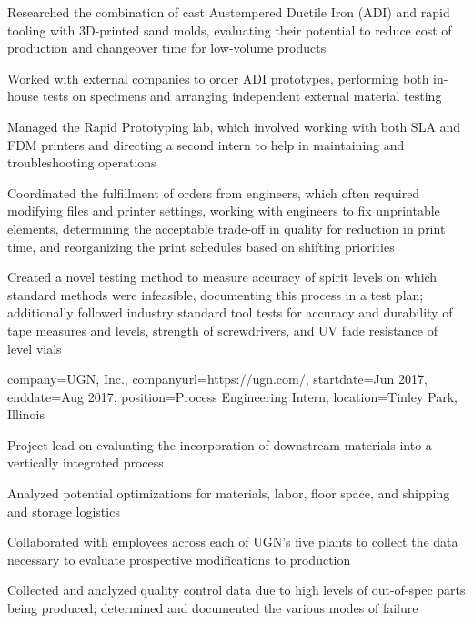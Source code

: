 \documentclass[10pt]{article}
\begin{document}
\begin{resume_sec}
\begin{subsec}
        \item Researched the combination of cast Austempered Ductile Iron (ADI) and rapid tooling with 3D-printed sand molds, evaluating their potential to reduce cost of production and changeover time for low-volume products
        \item Worked with external companies to order ADI prototypes, performing both in-house tests on specimens and arranging independent external material testing
        \item Managed the Rapid Prototyping lab, which involved working with both SLA and FDM printers and directing a second intern to help in maintaining and troubleshooting operations
        \item Coordinated the fulfillment of orders from engineers, which often required modifying files and printer settings, working with engineers to fix unprintable elements, determining the acceptable trade-off in quality for reduction in print time, and reorganizing the print schedules based on shifting priorities
        \item Created a novel testing method to measure accuracy of spirit levels on which standard methods were infeasible, documenting this process in a test plan; additionally followed industry standard tool tests for accuracy and durability of tape measures and levels, strength of screwdrivers, and UV fade resistance of level vials
    \end{subsec}
    
    \begin{subsec}
        {
            company={UGN, Inc.},
            companyurl={https://ugn.com/},
            startdate={Jun 2017},
            enddate={Aug 2017},
            position={Process Engineering Intern},
            location={Tinley Park, Illinois}
        }
        
        \item Project lead on evaluating the incorporation of downstream materials into a vertically integrated process
        \item Analyzed potential optimizations for materials, labor, floor space, and shipping and storage logistics
        \item Collaborated with employees across each of UGN's five plants to collect the data necessary to evaluate prospective modifications to production
        \item Collected and analyzed quality control data due to high levels of out-of-spec parts being produced; determined and documented the various modes of failure
    \end{subsec}
\end{resume_sec}
\end{document}

